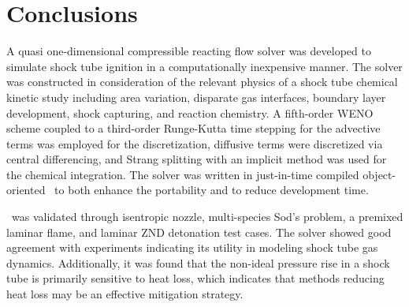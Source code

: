 \begin{table}[!t!]
	\centering
	\footnotesize
	\caption{\label{TABLE_OPT} Summary table of the configurations for the \stnshk\ driver insert runs. Experimental and simulated pressure rises computed according to Eq.~\ref{EQ_PR}. The shock tube geometry matches that reported by Hong~\emph{et al.}~\cite{HONG_PANG_VASU_DAVIDSON_HANSON_SW2009} for the high pressure shock tube.}
\end{table}
\section{Conclusions}
A quasi one-dimensional compressible reacting flow solver was developed to simulate shock tube ignition in a computationally inexpensive manner. The solver was constructed in consideration of the relevant physics of a shock tube chemical kinetic study including area variation, disparate gas interfaces, boundary layer development, shock capturing, and reaction chemistry. A fifth-order WENO scheme coupled to a third-order Runge-Kutta time stepping for the advective terms was employed for the discretization, diffusive terms were discretized via central differencing, and Strang splitting with an implicit method was used for the chemical integration. The solver was written in just-in-time compiled object-oriented \python\ to both enhance the portability and to reduce development time. 

\stnshk\ was validated through isentropic nozzle, multi-species Sod's problem, a premixed laminar flame, and laminar ZND detonation test cases. The solver showed good agreement with experiments indicating its utility in modeling shock tube gas dynamics. Additionally, it was found that the non-ideal pressure rise in a shock tube is primarily sensitive to heat loss, which indicates that methods reducing heat loss may be an effective mitigation strategy.

